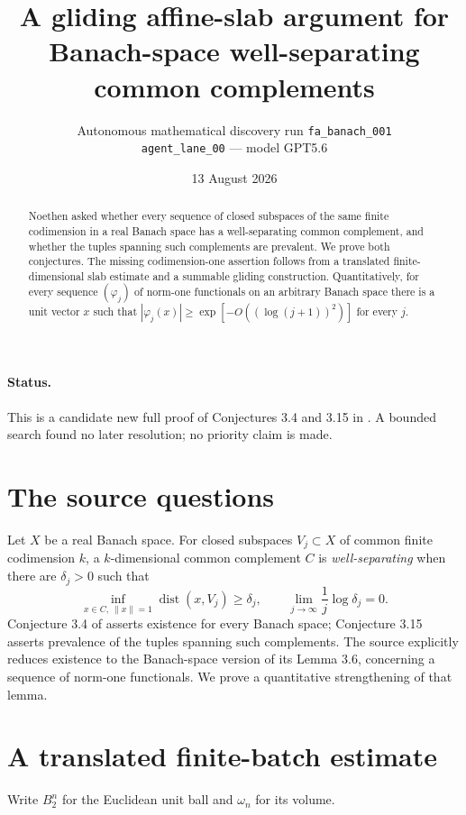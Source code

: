 \documentclass[11pt]{article}
\title{A gliding affine-slab argument for\\
Banach-space well-separating common complements}
\author{Autonomous mathematical discovery run \texttt{fa\_banach\_001}\\
\texttt{agent\_lane\_00} --- model GPT5.6}
\date{13 August 2026}
\newcommand{\dist}{\operatorname{dist}}
\begin{document}
\maketitle

\begin{abstract}
Noethen asked whether every sequence of closed subspaces of the same finite
codimension in a real Banach space has a well-separating common complement,
and whether the tuples spanning such complements are prevalent.  We prove
both conjectures.  The missing codimension-one assertion follows from a
translated finite-dimensional slab estimate and a summable gliding
construction.  Quantitatively, for every sequence $(\varphi_j)$ of norm-one
functionals on an arbitrary Banach space there is a unit vector $x$ such that
$|\varphi_j(x)|\geq \exp[-O((\log(j+1))^2)]$ for every $j$.
\end{abstract}

\paragraph{Status.}
This is a candidate new full proof of Conjectures 3.4 and 3.15 in
\cite{Noethen}.  A bounded search found no later resolution; no priority claim
is made.

\section{The source questions}

Let $X$ be a real Banach space.  For closed subspaces
$V_j\subset X$ of common finite codimension $k$, a $k$-dimensional common
complement $C$ is \emph{well-separating} when there are $\delta_j>0$ such
that
\[
 \inf_{x\in C,\ \|x\|=1}\dist(x,V_j)\geq\delta_j,
 \qquad
 \lim_{j\to\infty}\frac{1}{j}\log\delta_j=0.
\]
Conjecture 3.4 of \cite{Noethen} asserts existence for every Banach space;
Conjecture 3.15 asserts prevalence of the tuples spanning such complements.
The source explicitly reduces existence to the Banach-space version of its
Lemma 3.6, concerning a sequence of norm-one functionals.  We prove a
quantitative strengthening of that lemma.

\section{A translated finite-batch estimate}

Write $B_2^n$ for the Euclidean unit ball and $\omega_n$ for its volume.
\end{document}
